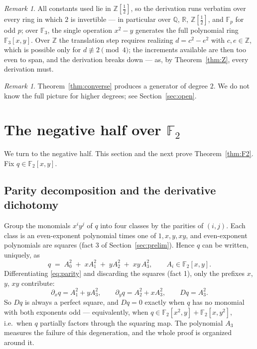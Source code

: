 \documentclass[11pt]{article}
\theoremstyle{definition}
\theoremstyle{remark}
\newtheorem{remark}[theorem]{Remark}
\newcommand{\F}{\mathbb{F}}
\newcommand{\Z}{\mathbb{Z}}
\newcommand{\Q}{\mathbb{Q}}
\begin{document}
\begin{remark}
All constants used lie in $\Z[\tfrac12]$, so the derivation runs
verbatim over every ring in which $2$ is invertible --- in particular
over $\Q$, $\mathbb{R}$, $\Z[\tfrac12]$, and $\F_p$ for odd $p$; over
$\F_3$, the single operation $x^2 - y$ generates the full polynomial
ring $\F_3[x,y]$.  Over $\Z$ the translation step requires
realizing $d = c^2 - e^2$ with $c, e \in \Z$, which is possible only
for $d \not\equiv 2 \pmod 4$; the increments available are then too
even to span, and the derivation breaks down --- as, by
Theorem~\ref{thm:Z}, every derivation must.
\end{remark}

\begin{remark}
Theorem~\ref{thm:converse} produces a generator of degree
$2$.  We do not know the full picture for higher degrees; see
Section~\ref{sec:open}.
\end{remark}

\section{The negative half over $\F_2$}\label{sec:dichotomy}

We turn to the negative half.  This section and the next prove
Theorem~\ref{thm:F2}.  Fix $q \in \F_2[x,y]$.

\subsection{Parity decomposition and the derivative dichotomy}

Group the monomials $x^i y^j$ of $q$ into four classes by the parities
of $(i,j)$.  Each class is an even-exponent polynomial times one of
$1, x, y, xy$, and even-exponent polynomials are squares (fact 3
of Section~\ref{sec:prelim}).  Hence $q$ can be written, uniquely, as
\begin{equation}\label{eq:parity}
  q \;=\; A_0^2 \;+\; x A_1^2 \;+\; y A_2^2 \;+\; xy\,A_3^2,
  \qquad A_i \in \F_2[x,y].
\end{equation}
Differentiating \eqref{eq:parity} and discarding the squares
(fact 1), only the prefixes $x$, $y$, $xy$ contribute:
\begin{equation}\label{eq:partials}
  \partial_x q = A_1^2 + y A_3^2, \qquad
  \partial_y q = A_2^2 + x A_3^2, \qquad
  Dq = A_3^2 .
\end{equation}
So $Dq$ is always a perfect square, and $Dq = 0$ exactly when $q$ has
no monomial with both exponents odd --- equivalently, when
$q \in \F_2[x^2, y] + \F_2[x, y^2]$, i.e.\ when $q$ partially factors
through the squaring map.  The polynomial $A_3$ measures the failure
of this degeneration, and the whole proof is organized around it.
\end{document}

